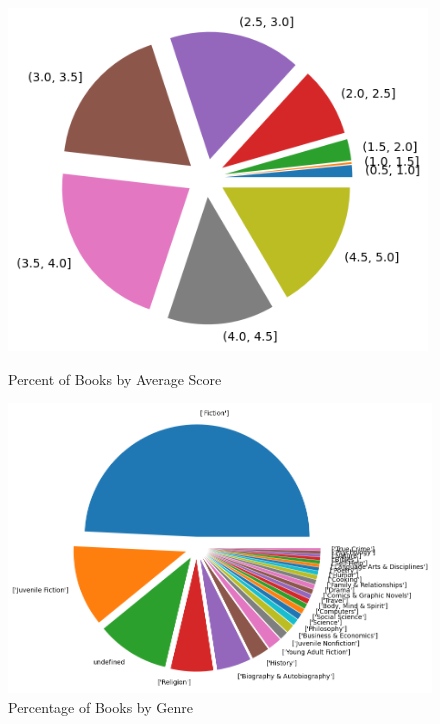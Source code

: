\documentclass[12pt]{article}
\numberwithin{equation}{section}
\begin{document}
\begin{figure}
    \begin{minipage}[b]{0.5\linewidth}
    \centering
    \includegraphics[width=0.99\textwidth]{percent_book_reviews.png}
    \caption{Percent of Books by Average Score}
\end{minipage}
    \hspace{0.01cm}
\begin{minipage}[b]{0.45\linewidth}
    \centering
    \includegraphics[width=1.2\textwidth]{genre_counts.png}
    \caption{Percentage of Books by Genre}
    \end{minipage}
\end{figure}
\end{document}
